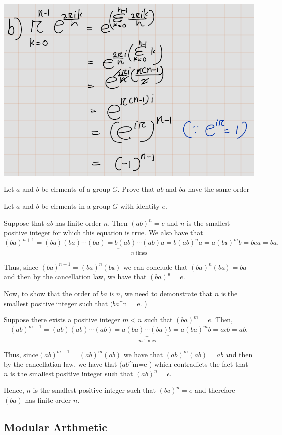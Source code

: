 \documentclass[
]{book}
\begin{document}
\includegraphics{figures/ch_2/fig28.png}

\leavevmode{}%
Let \(a\) and \(b\) be elements of a group \(G\). Prove that \(ab\) and
\(ba\) have the same order

Let \(a\) and \(b\) be elements in a group \(G\) with identity \(e\).

Suppose that \(ab\) has finite order \(n\). Then \((ab)^n = e\) and
\(n\) is the smallest positive integer for which this equation is true.
We also have that
\[ (ba)^{n+1} = (ba)(ba) \cdots (ba) = b\underbrace{(ab) \cdots (ab)}_{n \text{ times}}a =b(ab)^na=a(ba)^m b =bea = ba. \]

Thus, since \((ba)^{n+1} = (ba)^n(ba)\) we can conclude that
\((ba)^n(ba) = ba\) and then by the cancellation law, we have that
\((ba)^n = e.\)

Now, to show that the order of \(ba\) is \(n\), we need to demonstrate
that \(n\) is the smallest positive integer such that \((ba\)\^{}n = e.
)

Suppose there exists a positive integer \(m < n\) such that
\((ba)^m = e.\) Then,\[
(ab)^{m+1} =(ab)(ab)\cdots(ab)=a\underbrace{(ba)\cdots(ba)}_{m \text{ times}}b=a(ba)^m b=aeb= ab.
\]

Thus, since\((ab)^{m+1} =(ab)^m(ab)\) we have that \((ab)^m(ab)= ab\)
and then by the cancellation law, we have that \((ab\)\^{}m=e ) which
contradicts the fact that \(n\) is the smallest positive integer such
that \((ab)^n=e.\)

Hence, \(n\) is the smallest positive integer such that \((ba)^n=e\) and
therefore \((ba)\) has finite order \(n\).

\hypertarget{modular-arthmetic}{%
\subsection{Modular Arthmetic}\label{modular-arthmetic}}
\end{document}
